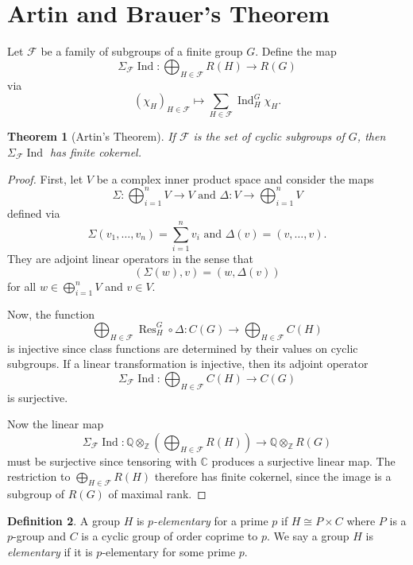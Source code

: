 \documentclass[12pt]{article}
\theoremstyle{plain}
\newtheorem{theorem}{Theorem}[section]
\theoremstyle{definition}
\newtheorem{definition}[theorem]{Definition}
\theoremstyle{remark}
\numberwithin{equation}{section}
\begin{document}
\section{Artin and Brauer's Theorem}

Let $\mathcal{F}$ be a family of subgroups of a finite group $G$.
Define the map
\[
\Sigma_{\mathcal{F}} \operatorname{Ind} :
\bigoplus_{H \in \mathcal{F}} R(H) \to R(G)
\]
via
\[
(\chi_H)_{H \in \mathcal{F}} \mapsto \sum_{H \in \mathcal{F}}
\operatorname{Ind}_H^G \chi_H .
\]

\begin{theorem}[Artin's Theorem]
If $\mathcal{F}$ is the set of cyclic subgroups of $G$,
then $\Sigma_{\mathcal{F}} \operatorname{Ind}$ has finite cokernel.
\end{theorem}

\begin{proof}
First, let $V$ be a complex inner product space and consider the maps
\[
\Sigma : \bigoplus_{i=1}^n V \to V \textrm{ and }
\Delta : V \to \bigoplus_{i=1}^n V
\]
defined via
\[
\Sigma\left(v_1,\ldots,v_n\right) = \sum_{i=1}^n v_i \textrm{ and }
\Delta(v) = (v,\ldots,v).
\]
They are adjoint linear operators in the sense that
\[
\left( \Sigma(w), v \right) = \left( w, \Delta(v) \right)
\]
for all $w \in \bigoplus_{i=1}^n V$ and $v \in V$.

Now, the function
\[
\bigoplus_{H \in \mathcal{F}} \operatorname{Res}^G_H \circ \Delta:
C(G) \to \bigoplus_{H \in \mathcal{F}} C(H)
\]
is injective since class functions are determined by their values on
cyclic subgroups.
If a linear transformation is injective, then its adjoint operator
\[
\Sigma_{\mathcal{F}} \operatorname{Ind} :
\bigoplus_{H \in \mathcal{F}} C(H) \to C(G)
\]
is surjective.

Now the linear map
\[
\Sigma_{\mathcal{F}} \operatorname{Ind} :
\mathbb{Q} \otimes_{\mathbb{Z}}
\left(\bigoplus_{H \in \mathcal{F}} R(H)\right)
\to \mathbb{Q} \otimes_{\mathbb{Z}} R(G)
\]
must be surjective since tensoring with $\mathbb{C}$ produces a
surjective linear map.
The restriction to $\bigoplus_{H \in \mathcal{F}} R(H)$
therefore has finite cokernel, since the image is a subgroup of $R(G)$
of maximal rank.
\end{proof}

\begin{definition}
A group $H$ is \emph{$p$-elementary} for a prime $p$ if
$H \cong P \times C$ where $P$ is a $p$-group and $C$ is a cyclic group
of order coprime to $p$.
We say a group $H$ is \emph{elementary} if it is $p$-elementary for some
prime $p$.
\end{definition}
\end{document}
